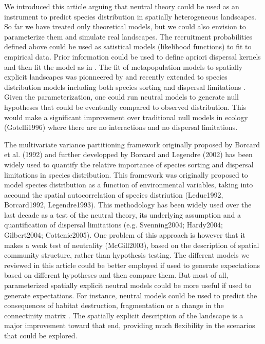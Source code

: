 \documentclass[12pt]{article}
\begin{document}
We introduced this article arguing that neutral theory could be used as an
instrument to predict species distribution in spatially heterogeneous
landscapes. So far we have treated only theoretical models, but we could also
envision to parameterize them and simulate real landscapes. The recruitment
probabilities defined above could be used as satistical models (likelihood
functions) to fit to empirical data. Prior information could be used to define
apriori dispersal kernels and then fit the model as in \textcite{Gravel2008}.
The fit of metapopulation models to spatially explicit landscapes was pionneered
by \textcite{Hanski1998} and recently extended to species distribution models
including both species sorting and dispersal limitations
\parencite{Boulangeat2012}. Given the parameterization, one could run neutral
models to generate null hypotheses that could be eventually compared to observed
distribution. This would make a significant improvement over traditional null
models in ecology (Gotelli1996) where there are no interactions and no dispersal
limitations.

The multivariate variance partitioning framework originally proposed by Borcard
et al. (1992) and further developped by Borcard and Legendre (2002) has been
widely used to quantify the relative importance of species sorting and dispersal
limitations in species distribution. This framework was originally proposed to
model species distribution as a function of environmental variables, taking into
accound the spatial autocorrelation of species distriution (Leduc1992,
Borcard1992, Legendre1993). This methodology has been widely used over the last
decade as a test of the neutral theory, its underlying assumption and a
quantification of dispersal limitations (e.g. Svenning2004; Hardy2004;
Gilbert2004; Cottenie2005). One problem of this approach is however that it
makes a weak test of neutrality (McGill2003), based on the description of
spatial community structure, rather than hypothesis testing. The different
models we reviewed in this article could be better employed if used to generate
expectations based on different hypotheses and then compare them. But most of
all, parameterized spatially explicit neutral models could be more useful if
used to generate expectations. For instance, neutral models could be used to
predict the consequences of habitat destruction, fragmentation or a change in
the connectinity matrix \parencite{Hubbell2008}. The spatially explicit
description of the landscape is a major improvement toward that end, providing
much flexibility in the scenarios that could be explored.
\end{document}
